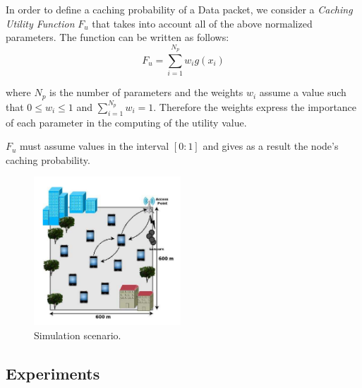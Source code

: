 \documentclass[conference]{IEEEtran}
\begin{document}


In order to define a caching probability of a Data packet, we consider a \textit{Caching Utility Function} $F_u$ that takes into account
all of the above normalized parameters. The function can be written as follows:
$$F_u = \sum_{i = 1}^{N_p} w_i g(x_i)$$

where $N_p$ is the number of parameters and the weights $w_i$ assume a value such that $0 \leq w_i \leq 1$ and $\sum_{i = 1}^{N_p} w_i = 1$.
Therefore the weights express the importance of each parameter in the computing of the utility value.

$F_u$ must assume values in the interval $[0 : 1]$ and gives as a result the node's caching probability.

\begin{figure}[htbp]
    \centerline{\includegraphics[width=5.5cm]{fig1.png}}
    \caption{Simulation scenario.}
    \label{fig1}
\end{figure}

\subsection{Experiments}
\end{document}
